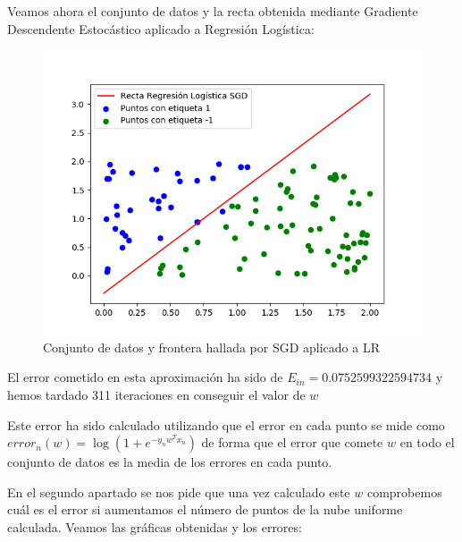 \documentclass[12pt,a4paper]{article}
\begin{document}
Veamos ahora el conjunto de datos y la recta obtenida mediante Gradiente Descendente Estocástico aplicado a Regresión Logística:

\begin{figure}[H]
	\centering
	\includegraphics[scale=0.7]{./Imagenes/ej2-24.png}
	\caption{Conjunto de datos y frontera hallada por SGD aplicado a LR}
\end{figure}

El error cometido en esta aproximación ha sido de $E_{in}=0.0752599322594734$ y hemos tardado 311 iteraciones en conseguir el valor de $w$

Este error ha sido calculado utilizando que el error en cada punto se mide como $error_n(w) = \log (1+e^{-y_nw^Tx_n})$ de forma que el error que comete $w$ en todo el conjunto de datos es la media de los errores en cada punto.

En el segundo apartado se nos pide que una vez calculado este $w$ comprobemos cuál es el error si aumentamos el número de puntos de la nube uniforme calculada. Veamos las gráficas obtenidas y los errores:
\end{document}
